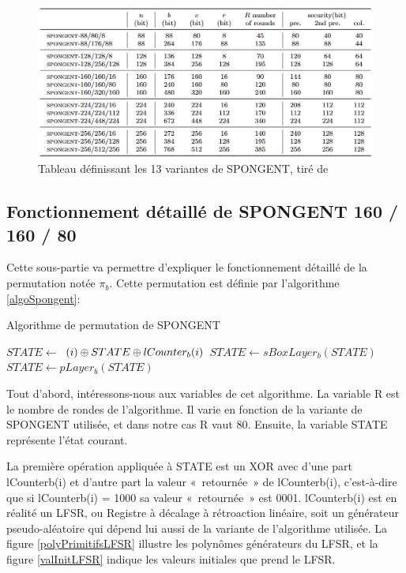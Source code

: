 		\begin{figure}[!h]
			\centering
			\includegraphics[width=\textwidth]{imgs/Spongent/varianteSpongent.png}
			\caption{Tableau définissant  les 13 variantes de SPONGENT, tiré de \cite{6275435}}
			\label{variantesSpongent}
 		\end{figure}

		\subsection{Fonctionnement détaillé de SPONGENT 160 / 160 / 80}
		Cette sous-partie va permettre d’expliquer le fonctionnement détaillé de la permutation notée $\pi_{b}$.
		Cette permutation est définie par l’algorithme \ref{algoSpongent}:
		\begin{algorithm}
			\caption{Algorithme de permutation de SPONGENT}
			\label{algoSpongent}
			\begin{algorithmic}
					\STATE $ STATE \leftarrow $ $(i) \mathbin{\oplus} STATE \mathbin{\oplus} lCounter_{b}(i)$
					\STATE $ STATE \leftarrow sBoxLayer_{b}(STATE)$
					\STATE $ STATE \leftarrow pLayer_{b}(STATE)$
				\ENDFOR
			\end{algorithmic}
		\end{algorithm}

		Tout d’abord, intéressons-nous aux variables de cet algorithme.
		La variable R est le nombre de rondes de l’algorithme. Il varie en fonction de la variante de SPONGENT utilisée, et dans notre cas R vaut 80.
		Ensuite, la variable STATE représente l’état courant.

		La première opération appliquée à STATE est un XOR avec d’une part lCounterb(i) et d’autre part la valeur « retournée » de lCounterb(i),
		c’est-à-dire que si lCounterb(i) = 1000 sa valeur « retournée » est 0001. lCounterb(i) est en réalité un LFSR, ou Registre à décalage à rétroaction linéaire,
		soit un générateur pseudo-aléatoire qui dépend lui aussi de la variante de l’algorithme utilisée.
		La figure \ref{polyPrimitifsLFSR} illustre les polynômes générateurs du LFSR, et la figure \ref{valInitLFSR} indique les valeurs initiales que prend le LFSR.

